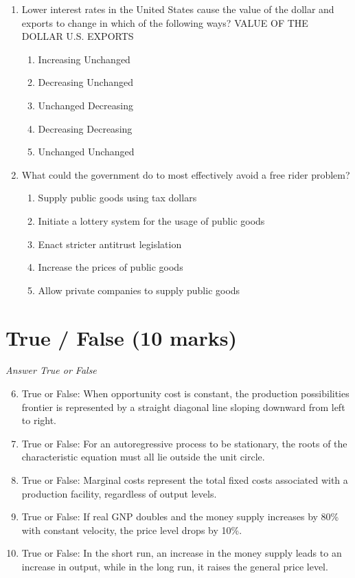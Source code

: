 \documentclass[12pt]{article}
\begin{document}
\begin{enumerate}[label=\arabic*.]
\item Lower interest rates in the United States cause the value of the dollar and exports to change in which of the following ways? VALUE OF THE DOLLAR U.S. EXPORTS
\begin{enumerate}[label=(\alph*)]
    \item Increasing Unchanged
    \item Decreasing Unchanged
    \item Unchanged Decreasing
    \item Decreasing Decreasing
    \item Unchanged Unchanged
\end{enumerate}
\item What could the government do to most effectively avoid a free rider problem?
\begin{enumerate}[label=(\alph*)]
    \item Supply public goods using tax dollars
    \item Initiate a lottery system for the usage of public goods
    \item Enact stricter antitrust legislation
    \item Increase the prices of public goods
    \item Allow private companies to supply public goods
\end{enumerate}
\end{enumerate}

\section*{True / False (10 marks)}
\textit{Answer True or False}
\begin{enumerate}[label=\arabic*.]
\setcounter{enumi}{5}
\item True or False: When opportunity cost is constant, the production possibilities frontier is represented by a straight diagonal line sloping downward from left to right.
\item True or False: For an autoregressive process to be stationary, the roots of the characteristic equation must all lie outside the unit circle.
\item True or False: Marginal costs represent the total fixed costs associated with a production facility, regardless of output levels.
\item True or False: If real GNP doubles and the money supply increases by 80\% with constant velocity, the price level drops by 10\%.
\item True or False: In the short run, an increase in the money supply leads to an increase in output, while in the long run, it raises the general price level.
\end{enumerate}
\end{document}

